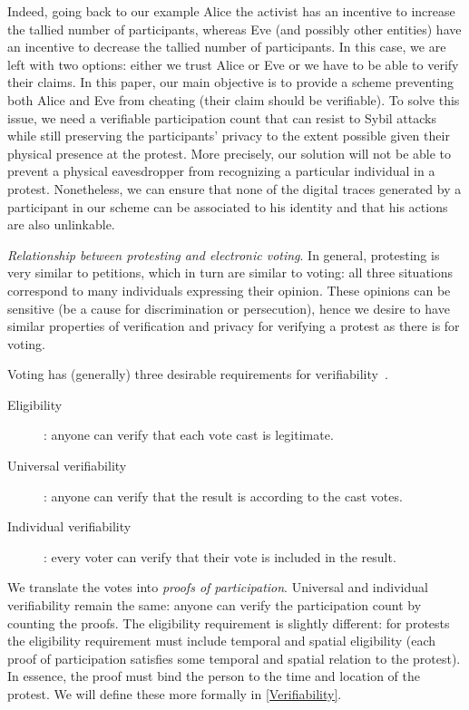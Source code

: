 Indeed, going back to our example Alice the activist has an incentive to increase the tallied number of participants, whereas Eve (and possibly other entities) have an incentive to decrease the tallied number of participants.
In this case, we are left with two options: either we trust Alice or Eve or we have to be able to verify their claims.
In this paper, our main objective is to provide a scheme preventing both Alice and Eve from cheating (\ie their claim should be verifiable).
To solve this issue, we need a verifiable participation count that can resist to Sybil attacks while still preserving the participants'
privacy to the extent possible given their physical presence at the protest. 
More precisely, our solution will not be able to prevent a physical eavesdropper from recognizing a particular individual in a protest. 
Nonetheless, we can ensure that none of the digital traces generated by a participant in our scheme can be associated to his identity and that his actions are also unlinkable.

\emph{Relationship between protesting and electronic voting}. In general, protesting is very similar to petitions, which in turn are similar to voting: all three situations correspond to many individuals expressing their opinion.
These opinions can be sensitive (\eg be a cause for discrimination or persecution), hence we desire to have similar properties of verification and privacy for verifying a protest as there is for voting.

Voting has (generally) three desirable requirements for verifiability~\cite{VerifyingPrivacyPropertiesOfVotingProtocols}.
\begin{description}
  \item[Eligibility]: anyone can verify that each vote cast is legitimate.
  \item[Universal verifiability]: anyone can verify that the result is according to the cast votes.
  \item[Individual verifiability]: every voter can verify that their vote is included in the result.
\end{description}
We translate the votes into \emph{proofs of participation}.
Universal and individual verifiability remain the same: anyone can verify the participation count by counting the proofs.
The eligibility requirement is slightly different: for protests the eligibility requirement must include temporal and spatial 
eligibility (\ie each proof of participation satisfies some temporal and spatial relation to the protest).
In essence, the proof must bind the person to the time and location of the protest.
We will define these more formally in \cref{Verifiability}.

